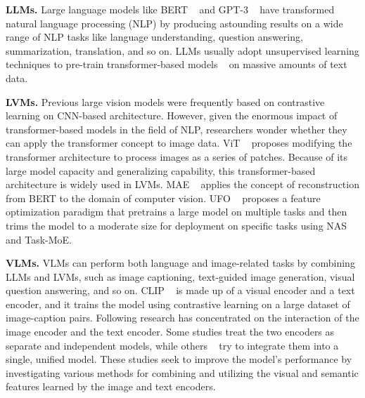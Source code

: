 \documentclass[10pt,twocolumn,letterpaper]{article}
\begin{document}
\textbf{LLMs.} Large language models like BERT ~\cite{devlin-etal-2019-bert} and GPT-3 ~\cite{NEURIPS2020_1457c0d6} have transformed natural language processing (NLP) by producing astounding results on a wide range of NLP tasks like language understanding, question answering, summarization, translation, and so on. LLMs usually adopt unsupervised learning techniques to pre-train transformer-based models ~\cite{NIPS2017_3f5ee243} on massive amounts of text data. 

\textbf{LVMs.} Previous large vision models were frequently based on contrastive learning on CNN-based architecture. However, given the enormous impact of transformer-based models in the field of NLP, researchers wonder whether they can apply the transformer concept to image data. ViT ~\cite{dosovitskiy2020vit} proposes modifying the transformer architecture to process images as a series of patches. Because of its large model capacity and generalizing capability, this transformer-based architecture is widely used in LVMs. MAE ~\cite{He_2022_CVPR} applies the concept of reconstruction from BERT to the domain of computer vision. UFO ~\cite{xi2022ufo} proposes a feature optimization paradigm that pretrains a large model on multiple tasks and then trims the model to a moderate size for deployment on specific tasks using NAS and Task-MoE.

\textbf{VLMs.} VLMs can perform both language and image-related tasks by combining LLMs and LVMs, such as image captioning, text-guided image generation, visual question answering, and so on. CLIP ~\cite{Radford2021LearningTV} is made up of a visual encoder and a text encoder, and it trains the model using contrastive learning on a large dataset of image-caption pairs. Following research has concentrated on the interaction of the image encoder and the text encoder. Some studies treat the two encoders as separate and independent models, while others ~\cite{pmlr-v139-kim21k} try to integrate them into a single, unified model. These studies seek to improve the model's performance by investigating various methods for combining and utilizing the visual and semantic features learned by the image and text encoders.
\end{document}
